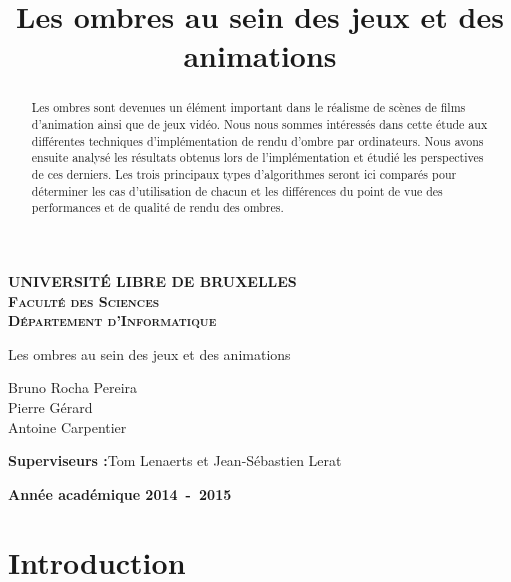 \documentclass[a4paper,12pt]{report}
\title{Les ombres au sein des jeux et des animations}
\begin{document}
\newcommand*{\captionsource}[2]{%
  \caption[{#1}]{%
    #1%
    \\\hspace{\linewidth}%
    \textbf{Source:} #2%
  }%
}



\begin{titlepage}
\begin{center}
\textbf{\textsc{UNIVERSIT\'E LIBRE DE BRUXELLES}}\\
\textbf{\textsc{Faculté des Sciences}}\\
\textbf{\textsc{Département d'Informatique}}
\vfill{}\vfill{}
\begin{center}{\Huge Les ombres au sein des jeux et des animations}\end{center}{\Huge \par}
\begin{center}{\large Bruno Rocha Pereira\\ Pierre Gérard\\ Antoine Carpentier}\end{center}{\Huge \par}
\vfill{}\vfill{}
\begin{flushleft}{\large \textbf{Superviseurs :}}\hfill{Tom Lenaerts et Jean-Sébastien Lerat}\end{flushleft}{\large\par}
\vfill{}\vfill{}\enlargethispage{3cm}
\textbf{Année académique 2014~-~2015}
\end{center}
\end{titlepage}

\begin{abstract}
Les ombres sont devenues un élément important dans le réalisme de scènes de films d'animation ainsi que de jeux vidéo. Nous nous sommes intéressés dans cette étude aux différentes techniques d'implémentation de rendu d'ombre par ordinateurs. Nous avons ensuite analysé les résultats obtenus lors de l'implémentation et étudié les perspectives de ces derniers. Les trois principaux types d'algorithmes seront ici comparés pour déterminer les cas d'utilisation de chacun et les différences du point de vue des performances et de qualité de rendu des ombres.
\end{abstract}



\tableofcontents


\chapter{Introduction}
\end{document}
